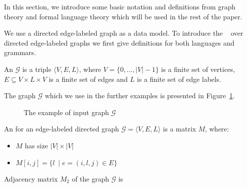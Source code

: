 
In this section, we introduce some basic notation and definitions from graph theory and formal language theory which will be used in the rest of the paper.


We use a directed edge-labeled graph as a data model.
To introduce the ~\cite{barrett2000formal} over directed edge-labeled graphs we first give definitions for both languages and grammars.

\begin{definition}
An  $\mathcal{G}$ is a triple $\langle V,E,L \rangle$, where $V = \{0, \ldots, |V|-1\}$ is a finite set of vertices, $E \subseteq V \times L \times V$ is a finite set of edges and $L$ is a finite set of edge labels.
\end{definition}

The graph  $\mathcal{G}$  which we use in the further examples is presented in Figure~\ref{fig:example_input_graph}.

\begin{figure}[h!]
    \centering
    \caption{The example of input graph $\mathcal{G}$}
    \label{fig:example_input_graph}
\end{figure}

\begin{definition}
An  for an edge-labeled directed graph $\mathcal{G} = \langle V,E,L \rangle$ is a matrix $M$, where:
\begin{itemize}
    \item $M$ has size $|V|\times|V|$
    \item $M[i,j] = \{l~\mid e = (i,l,j) \in E\}$
\end{itemize}
\end{definition}

Adjacency matrix $M_2$ of the graph $\mathcal{G}$ is

